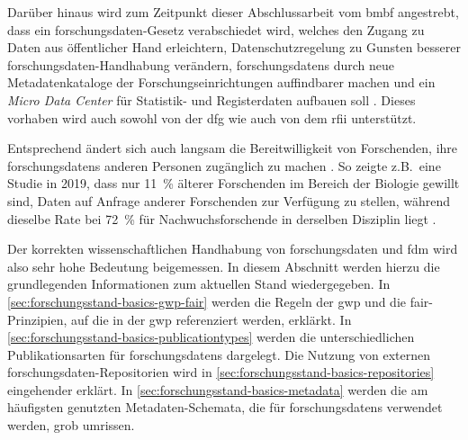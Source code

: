 Darüber hinaus wird zum Zeitpunkt dieser Abschlussarbeit vom \gls{bmbf} angestrebt, dass ein \gls{forschungsdaten}-Gesetz verabschiedet wird, welches den Zugang zu Daten aus öffentlicher Hand erleichtern, Datenschutzregelung zu Gunsten besserer \gls{forschungsdaten}-Handhabung verändern, \glspl{forschungsdaten} durch neue Metadatenkataloge der Forschungseinrichtungen auffindbarer machen und ein \textit{Micro Data Center} für Statistik- und Registerdaten aufbauen soll \autocite{bmbf2024}.
Dieses vorhaben wird auch sowohl von der \gls{dfg} \autocite{dfg2023-gesetz} wie auch von dem \gls{rfii} \autocite{rfii-gesetz} unterstützt.

Entsprechend ändert sich auch langsam die Bereitwilligkeit von Forschenden, ihre \glspl{forschungsdaten} anderen Personen zugänglich zu machen \autocite{Kaden2018}.
So zeigte z.B.~eine Studie in 2019, dass nur \SI{11}{\percent} älterer Forschenden im Bereich der Biologie gewillt sind, Daten auf Anfrage anderer Forschenden zur Verfügung zu stellen, während dieselbe Rate bei \SI{72}{\percent} für Nachwuchsforschende in derselben Disziplin liegt \autocite{Campbell2019}.


Der korrekten wissenschaftlichen Handhabung von \gls{forschungsdaten} und \gls{fdm} wird also sehr hohe Bedeutung beigemessen.
In diesem Abschnitt werden hierzu die grundlegenden Informationen zum aktuellen Stand wiedergegeben.
In \cref{sec:forschungsstand-basics-gwp-fair} werden die Regeln der \gls{gwp} und die \gls{fair}-Prinzipien, auf die in der \gls{gwp} referenziert werden, erklärkt.
In \cref{sec:forschungsstand-basics-publicationtypes} werden die unterschiedlichen Publikationsarten für \glspl{forschungsdaten} dargelegt.
Die Nutzung von externen \gls{forschungsdaten}-Repositorien wird in \cref{sec:forschungsstand-basics-repositories} eingehender erklärt.
In \cref{sec:forschungsstand-basics-metadata} werden die am häufigsten genutzten Metadaten-Schemata, die für \glspl{forschungsdaten} verwendet werden, grob umrissen.

